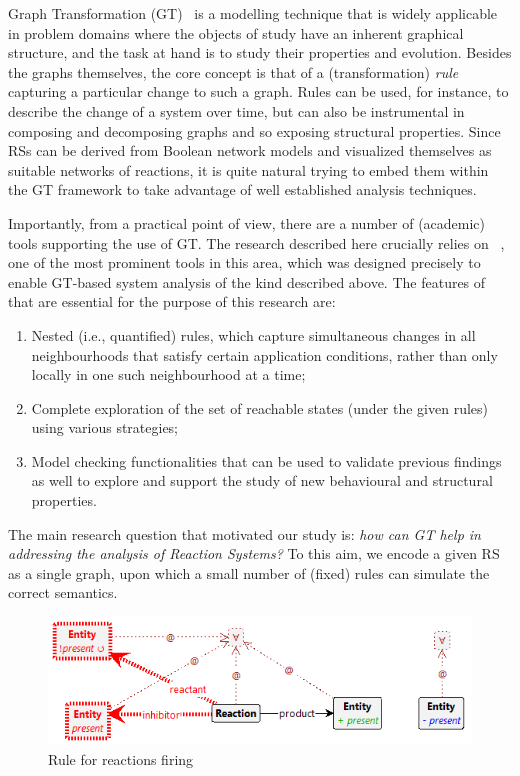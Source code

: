 Graph Transformation (GT)~\cite{DBLP:series/eatcs/EhrigEPT06,DBLP:books/sp/HeckelT20} is a modelling technique that is widely applicable in problem domains where the objects of study have an inherent graphical structure, and the task at hand is to study their properties and evolution. Besides the graphs themselves, the core concept is that of a (transformation) \emph{rule} capturing a particular change to such a graph. Rules can be used, for instance, to describe the change of a system over time, but can also be instrumental in composing and decomposing graphs and so exposing structural properties.
Since RSs can be derived from Boolean network models and visualized themselves as suitable networks of reactions, it is quite natural trying to embed them within the GT framework to take advantage of well established analysis techniques.

Importantly, from a practical point of view, there are a number of (academic) tools supporting the use of GT. The research described here crucially relies on \href{https://groove.cs.utwente.nl}{\GROOVE}~\cite{DBLP:journals/sttt/GhamarianMRZZ12}, one of the most prominent tools in this area, which was designed precisely to enable GT-based system analysis of the kind described above. The features of \GROOVE that are essential for the purpose of this research are:
\begin{enumerate}%
\item Nested (i.e., quantified) rules, which capture simultaneous changes in all neighbourhoods that satisfy certain application conditions, rather than only locally in one such neighbourhood at a time; 
\item Complete exploration of the set of reachable states (under the given rules) using various strategies;
\item Model checking functionalities that can be used to validate previous findings as well to explore and support the study of new behavioural and structural properties.
\end{enumerate}

The main research question that motivated our study is: 
\emph{how can GT help in addressing the analysis of Reaction Systems?} 
To this aim, we encode a given RS as a single graph, upon which a small number of (fixed) rules can simulate the correct semantics. 

\begin{figure}
\centering
\includegraphics[scale=.42]{react}
\caption{Rule for reactions firing}
\label{fig:reactionfiring}
\end{figure}

